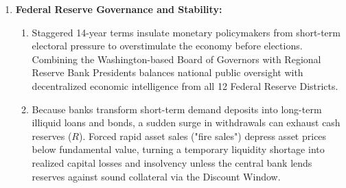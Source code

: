 \documentclass[11pt, oneside]{book}
\begin{document}
\begin{enumerate}[leftmargin=1.5em, itemsep=6pt]
  \item \textbf{Federal Reserve Governance and Stability:}
  \begin{enumerate}[label=(\alph*), itemsep=2pt]
    \item Staggered 14-year terms insulate monetary policymakers from short-term electoral pressure to overstimulate the economy before elections. Combining the Washington-based Board of Governors with Regional Reserve Bank Presidents balances national public oversight with decentralized economic intelligence from all 12 Federal Reserve Districts.
    \item Because banks transform short-term demand deposits into long-term illiquid loans and bonds, a sudden surge in withdrawals can exhaust cash reserves ($R$). Forced rapid asset sales ("fire sales") depress asset prices below fundamental value, turning a temporary liquidity shortage into realized capital losses and insolvency unless the central bank lends reserves against sound collateral via the Discount Window.
  \end{enumerate}
\end{enumerate}
\end{document}
